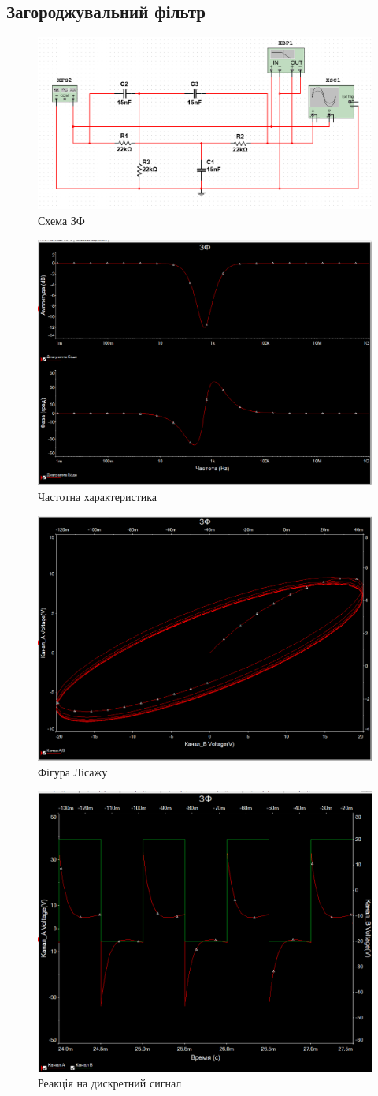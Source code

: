 \documentclass[
  ukrainian,
  14pt
]{extreport}
\begin{document}
\subsection{Загороджувальний фільтр}
\begin{figure}[H]
  \centering
  \includegraphics[width=.6\textwidth]{imgs/ZF-1.png}
  \caption{Схема ЗФ}
\end{figure}
\begin{figure}[H]
  \centering
  \includegraphics[width=.6\textwidth]{imgs/ZF-2.png}
  \caption{Частотна характеристика}
\end{figure}
\begin{figure}[H]
  \centering
  \includegraphics[width=.6\textwidth]{imgs/ZF-3.png}
  \caption{Фігура Лісажу}
\end{figure}
\begin{figure}[H]
  \centering
  \includegraphics[width=.6\textwidth]{imgs/ZF-4.png}
  \caption{Реакція на дискретний сигнал}
\end{figure}
\end{document}
